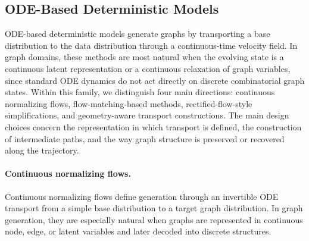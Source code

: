 \documentclass{article}
\begin{document}
\subsection{ODE-Based Deterministic Models}
\label{sec:ode_models}

ODE-based deterministic models generate graphs by transporting a base distribution to the data distribution through a continuous-time velocity field. In graph domains, these methods are most natural when the evolving state is a continuous latent representation or a continuous relaxation of graph variables, since standard ODE dynamics do not act directly on discrete combinatorial graph states. Within this family, we distinguish four main directions: continuous normalizing flows, flow-matching-based methods, rectified-flow-style simplifications, and geometry-aware transport constructions. The main design choices concern the representation in which transport is defined, the construction of intermediate paths, and the way graph structure is preserved or recovered along the trajectory.

\paragraph{Continuous normalizing flows.}
Continuous normalizing flows define generation through an invertible ODE transport from a simple base distribution to a target graph distribution. In graph generation, they are especially natural when graphs are represented in continuous node, edge, or latent variables and later decoded into discrete structures.
\end{document}
